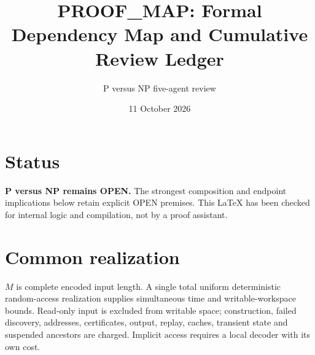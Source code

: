 \documentclass[11pt]{article}
\title{PROOF\_MAP: Formal Dependency Map and Cumulative Review Ledger}
\author{P versus NP five-agent review}
\date{11 October 2026}
\begin{document}
\maketitle

\section*{Status}
\textbf{P versus NP remains OPEN.}  The strongest composition and endpoint
implications below retain explicit OPEN premises.  This LaTeX has been checked
for internal logic and compilation, not by a proof assistant.

\section*{Common realization}
$M$ is complete encoded input length.  A single total uniform deterministic
random-access realization supplies simultaneous time and writable-workspace
bounds.  Read-only input is excluded from writable space; construction,
failed discovery, addresses, certificates, output, replay, caches, transient
state and suspended ancestors are charged.  Implicit access requires a local
decoder with its own cost.
\end{document}
